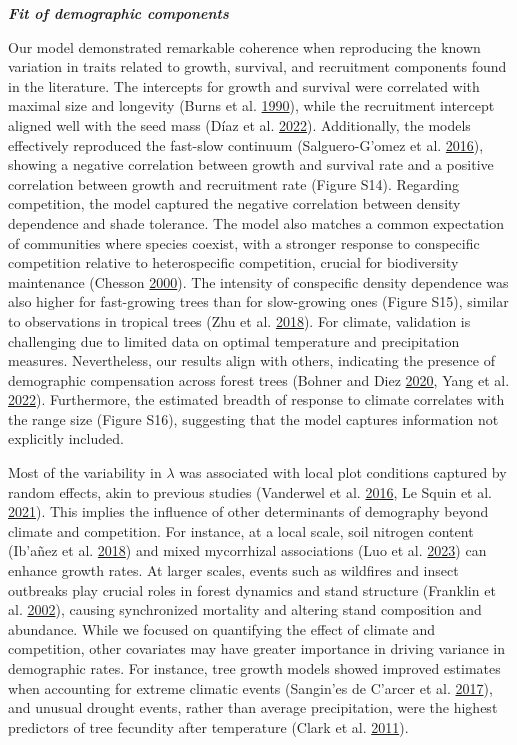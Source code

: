 \documentclass[12pt]{article}
\begin{document}
\textbf{\emph{Fit of demographic components}}

Our model demonstrated remarkable coherence when reproducing the known
variation in traits related to growth, survival, and recruitment
components found in the literature. The intercepts for growth and
survival were correlated with maximal size and longevity (Burns et al.
\protect\hyperlink{ref-burns1990silvics}{1990}), while the recruitment
intercept aligned well with the seed mass (Díaz et al.
\protect\hyperlink{ref-diaz2022}{2022}). Additionally, the models
effectively reproduced the fast-slow continuum (Salguero-G\a'omez et al.
\protect\hyperlink{ref-SalgueroGomez2016}{2016}), showing a negative
correlation between growth and survival rate and a positive correlation
between growth and recruitment rate (Figure S14). Regarding competition,
the model captured the negative correlation between density dependence
and shade tolerance. The model also matches a common expectation of
communities where species coexist, with a stronger response to
conspecific competition relative to heterospecific competition, crucial
for biodiversity maintenance (Chesson
\protect\hyperlink{ref-Chesson2000a}{2000}). The intensity of
conspecific density dependence was also higher for fast-growing trees
than for slow-growing ones (Figure S15), similar to observations in
tropical trees (Zhu et al. \protect\hyperlink{ref-Zhu2018}{2018}). For
climate, validation is challenging due to limited data on optimal
temperature and precipitation measures. Nevertheless, our results align
with others, indicating the presence of demographic compensation across
forest trees (Bohner and Diez \protect\hyperlink{ref-bohner2020}{2020},
Yang et al. \protect\hyperlink{ref-Yang2022}{2022}). Furthermore, the
estimated breadth of response to climate correlates with the range size
(Figure S16), suggesting that the model captures information not
explicitly included.

Most of the variability in \(\lambda\) was associated with local plot
conditions captured by random effects, akin to previous studies
(Vanderwel et al. \protect\hyperlink{ref-Vanderwel2016a}{2016}, Le Squin
et al. \protect\hyperlink{ref-LeSquin2021}{2021}). This implies the
influence of other determinants of demography beyond climate and
competition. For instance, at a local scale, soil nitrogen content
(Ib\a'añez et al. \protect\hyperlink{ref-Ibanez2018}{2018}) and mixed
mycorrhizal associations (Luo et al.
\protect\hyperlink{ref-Luo2023}{2023}) can enhance growth rates. At
larger scales, events such as wildfires and insect outbreaks play
crucial roles in forest dynamics and stand structure (Franklin et al.
\protect\hyperlink{ref-Franklin2002}{2002}), causing synchronized
mortality and altering stand composition and abundance. While we focused
on quantifying the effect of climate and competition, other covariates
may have greater importance in driving variance in demographic rates.
For instance, tree growth models showed improved estimates when
accounting for extreme climatic events (Sangin\a'es de C\a'arcer et al.
\protect\hyperlink{ref-Sangines2017}{2017}), and unusual drought events,
rather than average precipitation, were the highest predictors of tree
fecundity after temperature (Clark et al.
\protect\hyperlink{ref-Clark2011}{2011}).
\end{document}
